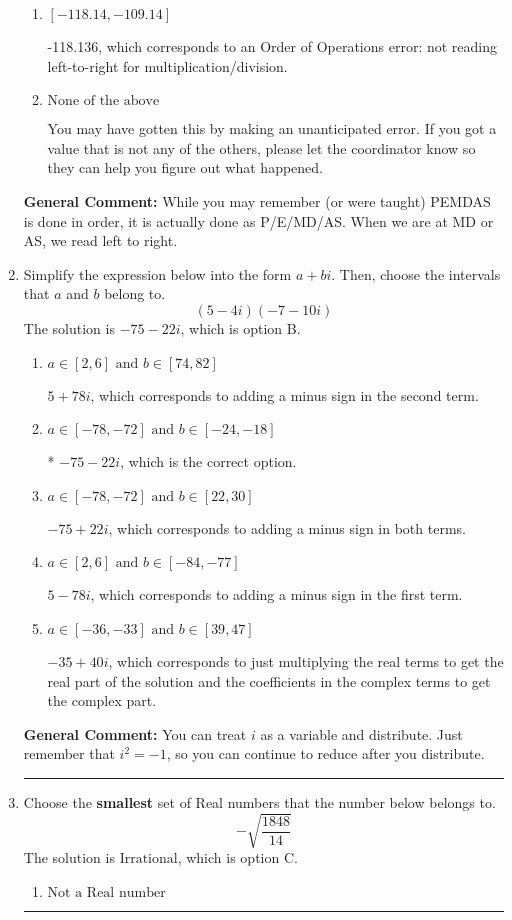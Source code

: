 \documentclass{extbook}[14pt]
\newcommand{\litem}[1]{\item #1

\rule{\textwidth}{0.4pt}}
\begin{document}
\begin{enumerate}
{\begin{enumerate}[label=\Alph*.]
 -161.500, which corresponds to not distributing a negative correctly.
\item \( [-118.14, -109.14] \)

 -118.136, which corresponds to an Order of Operations error: not reading left-to-right for multiplication/division.
\item \( \text{None of the above} \)

 You may have gotten this by making an unanticipated error. If you got a value that is not any of the others, please let the coordinator know so they can help you figure out what happened.
\end{enumerate}

\textbf{General Comment:} While you may remember (or were taught) PEMDAS is done in order, it is actually done as P/E/MD/AS. When we are at MD or AS, we read left to right.
}
\litem{
Simplify the expression below into the form $a+bi$. Then, choose the intervals that $a$ and $b$ belong to.
\[ (5 - 4 i)(-7 - 10 i) \]The solution is \( -75 - 22 i \), which is option B.\begin{enumerate}[label=\Alph*.]
\item \( a \in [2, 6] \text{ and } b \in [74, 82] \)

 $5 + 78 i$, which corresponds to adding a minus sign in the second term.
\item \( a \in [-78, -72] \text{ and } b \in [-24, -18] \)

* $-75 - 22 i$, which is the correct option.
\item \( a \in [-78, -72] \text{ and } b \in [22, 30] \)

 $-75 + 22 i$, which corresponds to adding a minus sign in both terms.
\item \( a \in [2, 6] \text{ and } b \in [-84, -77] \)

 $5 - 78 i$, which corresponds to adding a minus sign in the first term.
\item \( a \in [-36, -33] \text{ and } b \in [39, 47] \)

 $-35 + 40 i$, which corresponds to just multiplying the real terms to get the real part of the solution and the coefficients in the complex terms to get the complex part.
\end{enumerate}

\textbf{General Comment:} You can treat $i$ as a variable and distribute. Just remember that $i^2=-1$, so you can continue to reduce after you distribute.
}
\litem{
Choose the \textbf{smallest} set of Real numbers that the number below belongs to.
\[ -\sqrt{\frac{1848}{14}} \]The solution is \( \text{Irrational} \), which is option C.\begin{enumerate}[label=\Alph*.]
\item \( \text{Not a Real number} \)


\end{enumerate}}
\end{enumerate}
\end{document}
